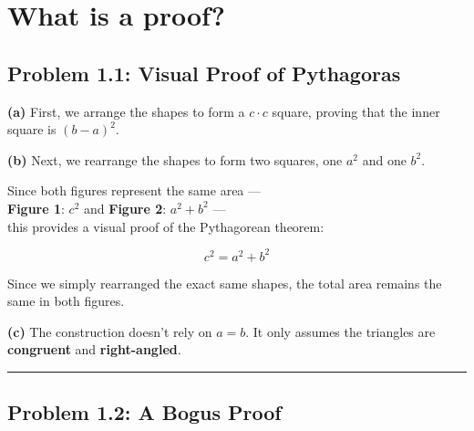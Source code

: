 \documentclass[
  letterpaper,
  DIV=11,
  numbers=noendperiod]{scrartcl}
\author{}
\date{}
\begin{document}
\section{What is a proof? 🔎}\label{what-is-a-proof}

\subsection{Problem 1.1: Visual Proof of
Pythagoras}\label{problem-1.1-visual-proof-of-pythagoras}

\textbf{(a)} First, we arrange the shapes to form a \(c \cdot c\)
square, proving that the inner square is \((b - a)^2\).

\textbf{(b)} Next, we rearrange the shapes to form two squares, one
\(a^2\) and one \(b^2\).

Since both figures represent the same area ---\\
\textbf{Figure 1}: \(c^2\) and \textbf{Figure 2}: \(a^2 + b^2\) ---\\
this provides a visual proof of the Pythagorean theorem:

\[
c^2 = a^2 + b^2
\]

\begin{tcolorbox}[enhanced jigsaw, leftrule=.75mm, title=\textcolor{quarto-callout-note-color}{\faInfo}\hspace{0.5em}{Note}, opacityback=0, arc=.35mm, bottomtitle=1mm, breakable, colframe=quarto-callout-note-color-frame, toprule=.15mm, toptitle=1mm, titlerule=0mm, colbacktitle=quarto-callout-note-color!10!white, left=2mm, bottomrule=.15mm, coltitle=black, colback=white, opacitybacktitle=0.6, rightrule=.15mm]

Since we simply rearranged the exact same shapes, the total area remains
the same in both figures.

\end{tcolorbox}

\textbf{(c)} The construction doesn't rely on \(a = b\). It only assumes
the triangles are \textbf{congruent} and \textbf{right-angled}.

\begin{center}\rule{0.5\linewidth}{0.5pt}\end{center}

\subsection{Problem 1.2: A Bogus Proof}\label{problem-1.2-a-bogus-proof}
\end{document}
